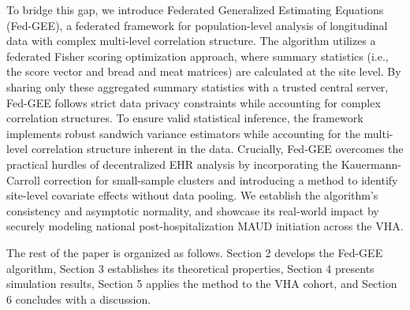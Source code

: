 \documentclass[useAMS,referee, usegraphicx]{biom}
\begin{document}
To bridge this gap, we introduce Federated Generalized Estimating Equations (Fed-GEE), a federated framework for population-level analysis of longitudinal data with complex multi-level correlation structure. The algorithm utilizes a federated Fisher scoring optimization approach, where  summary statistics (i.e., the score vector and bread and meat matrices) are calculated at the site level. By sharing only these aggregated summary statistics with a trusted central server, Fed-GEE follows strict data privacy constraints while accounting for complex correlation structures. To ensure valid statistical inference, the framework implements robust sandwich variance estimators while accounting for the multi-level correlation structure inherent in the data. Crucially, Fed-GEE overcomes the practical hurdles of decentralized EHR analysis by incorporating the {Kauermann-Carroll} correction for small-sample clusters \citep{kauermann2001note} and introducing a method to identify site-level covariate effects without data pooling. We establish the algorithm's consistency and asymptotic normality, and showcase its real-world impact by securely modeling national post-hospitalization MAUD initiation across the VHA. 

The rest of the paper is organized as follows. Section 2 develops the Fed-GEE algorithm, Section 3 establishes its theoretical properties, Section 4 presents simulation results, Section 5 applies the method to the VHA cohort, and Section 6 concludes with a discussion.
\end{document}
